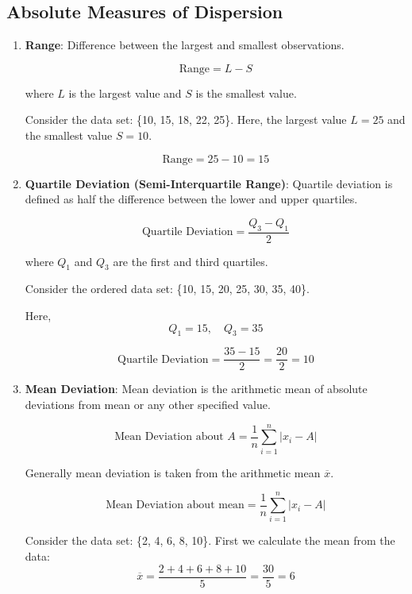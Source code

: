 \documentclass[twoside]{book}
\begin{document}
\subsection{Absolute Measures of Dispersion}

\begin{enumerate}
    \item \textbf{Range}: Difference between the largest and smallest observations.
    \begin{textbox}
        \[
    \text{Range} = L - S
    \]
    \end{textbox}
    where \( L \) is the largest value and \( S \) is the smallest value.

    Consider the data set: \{10, 15, 18, 22, 25\}.  
Here, the largest value \( L = 25 \) and the smallest value \( S = 10 \).  

\[
\text{Range} = 25 - 10 = 15
\]
    \item \textbf{Quartile Deviation (Semi-Interquartile Range)}: Quartile deviation is defined as half the difference between the lower and upper quartiles.
    \begin{textbox}
    \[
    \text{Quartile Deviation} = \frac{Q_3 - Q_1}{2}
    \]
    \end{textbox}
    where \( Q_1 \) and \( Q_3 \) are the first and third quartiles.

    Consider the ordered data set: \{10, 15, 20, 25, 30, 35, 40\}.

Here,
\[
Q_1 = 15, \quad Q_3 = 35
\]

\[
\text{Quartile Deviation} = \frac{35 - 15}{2} = \frac{20}{2} = 10
\]

    \item \textbf{Mean Deviation}: Mean deviation is the arithmetic mean of absolute deviations from mean or any other specified value.
    \begin{textbox}
    \[
    \text{Mean Deviation about }A = \frac{1}{n} \sum_{i=1}^{n} |x_i - A|
    \]
    \end{textbox}
    Generally mean deviation is taken from the arithmetic mean $\overline{x}$.
    \begin{textbox}
    \[
    \text{Mean Deviation about mean} = \frac{1}{n} \sum_{i=1}^{n} |x_i - A|
    \]
    \end{textbox}

    Consider the data set: \{2, 4, 6, 8, 10\}. First we calculate the mean from the data:
\[
\overline{x} = \frac{2 + 4 + 6 + 8 + 10}{5} = \frac{30}{5} = 6
\]


\end{enumerate}
\end{document}
